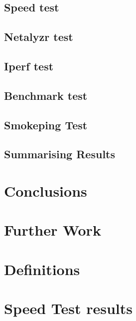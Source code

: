 \documentclass[letter, 11pt]{article}
\theoremstyle{plain}
\theoremstyle{definition}
\begin{document}
\subsection{Speed test}


\subsection{Netalyzr test}


\subsection{Iperf test}


\subsection{Benchmark test}


\subsection{Smokeping Test}


\subsection{Summarising Results}

\newpage
\section{Conclusions}

\newpage
\section{Further Work}

\newpage
\begin{appendix}
\section{Definitions}\label{app:definitions}

\section{Speed Test results}\label{app:bwmeasures}

\newpage
\end{appendix}
{}
\end{document}
